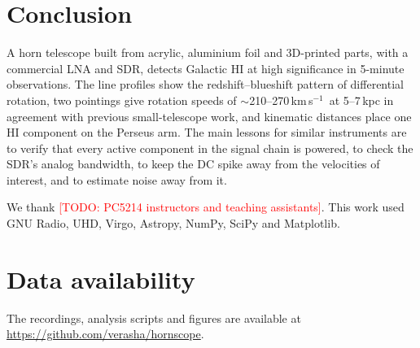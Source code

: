 \documentclass[aip,apl,reprint,amsmath,amssymb]{revtex4-2}
\newcommand{\todo}[1]{\textcolor{red}{[TODO: #1]}}
\newcommand{\kms}{km\,s$^{-1}$}
\begin{document}
\section{Conclusion}

A horn telescope built from acrylic, aluminium foil and 3D-printed parts, with a commercial LNA and SDR, detects Galactic HI at high significance in 5-minute observations. The line profiles show the redshift--blueshift pattern of differential rotation, two pointings give rotation speeds of $\sim$210--270\,\kms\ at 5--7\,kpc in agreement with previous small-telescope work, and kinematic distances place one HI component on the Perseus arm. The main lessons for similar instruments are to verify that every active component in the signal chain is powered, to check the SDR's analog bandwidth, to keep the DC spike away from the velocities of interest, and to estimate noise away from it.

\begin{acknowledgments}
We thank \todo{PC5214 instructors and teaching assistants}. This work used GNU Radio, UHD, Virgo, Astropy, NumPy, SciPy and Matplotlib.
\end{acknowledgments}

\section*{Data availability}
The recordings, analysis scripts and figures are available at \url{https://github.com/verasha/hornscope}.
\end{document}
